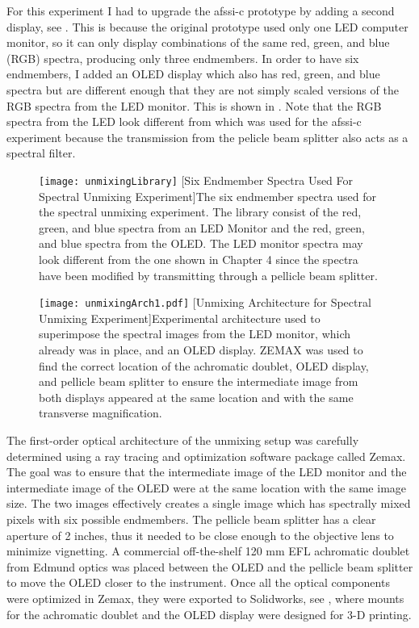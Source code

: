 For this experiment I had to upgrade the \gls{afssi-c} prototype by adding a second display, see . This is because the original prototype used only one LED computer monitor, so it can only display combinations of the same red, green, and blue (RGB) spectra, producing only three endmembers. In order to have six endmembers, I added an OLED display which also has red, green, and blue spectra but are different enough that they are not simply scaled versions of the RGB spectra from the LED monitor. This is shown in . Note that the RGB spectra from the LED look different from  which was used for the \gls{afssi-c} experiment because the transmission from the pelicle beam splitter also acts as a spectral filter. 

\begin{figure}
	\centering
	\texttt{[image: unmixingLibrary]}
	[Six Endmember Spectra Used For Spectral Unmixing Experiment]{The six endmember spectra used for the spectral unmixing experiment. The library consist of the red, green, and blue spectra from an LED Monitor and the red, green, and blue spectra from the OLED. The LED monitor spectra may look different from the one shown in Chapter 4 since the spectra have been modified by transmitting through a pellicle beam splitter. }
	\label{fig:unmixingLibrary}
\end{figure}

\begin{figure}
	\centering
	\texttt{[image: unmixingArch1.pdf]}
	[Unmixing Architecture for Spectral Unmixing Experiment]{Experimental architecture used to superimpose the spectral images from the LED monitor, which already was in place, and an OLED display. ZEMAX was used to find the correct location of the achromatic doublet, OLED display, and pellicle beam splitter to ensure the intermediate image from both displays appeared at the same location and with the same transverse magnification.}
	\label{fig:unmixingArch1}
\end{figure}

The first-order optical architecture of the unmixing setup was carefully determined using a ray tracing and optimization software package called Zemax. The goal was to ensure that the intermediate image of the LED monitor and the intermediate image of the OLED were at the same location with the same image size. The two images effectively creates a single image which has spectrally mixed pixels with six possible endmembers. The pellicle beam splitter has a clear aperture of 2 inches, thus it needed to be close enough to the objective lens to minimize vignetting. A commercial off-the-shelf 120 mm EFL achromatic doublet from Edmund optics was placed between the OLED and the pellicle beam splitter to move the OLED closer to the instrument. Once all the optical components were optimized in Zemax, they were exported to Solidworks, see , where mounts for the achromatic doublet and the OLED display were designed for 3-D printing. 

